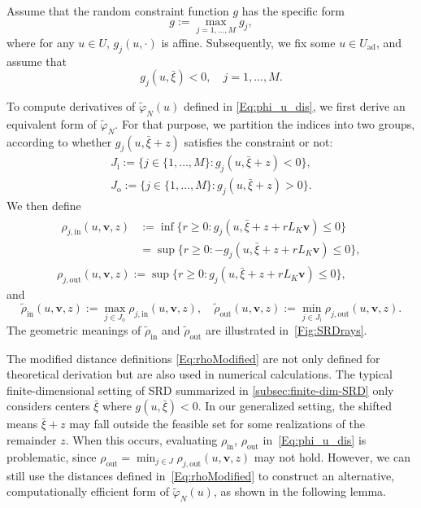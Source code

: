 \documentclass[%
onefignum,onetabnum]{siamonline250211}
\begin{document}
Assume that the random constraint function $g$ has the specific form
\begin{equation*}
    g:=\max_{j=1,\dots,M}g_j,
\end{equation*}
where for any $u\in U$, $g_j(u,\cdot)$ is affine. Subsequently, we fix some $u\in U_{\text{ad}}$, and assume that
\begin{equation}\label{Eq:neg_gj}
    g_j(u,\bar{\xi})<0,\quad j=1,\dots,M.
\end{equation}

To compute derivatives of $\tilde{\varphi}_N(u)$ defined in \eqref{Eq:phi_u_dis}, we first derive an equivalent form of $\tilde{\varphi}_N$. For that purpose, we partition the indices into two groups, according to whether $g_j(u,\bar{\xi}+z)$ satisfies the constraint or not:
\begin{gather*}
    J_{\mathrm{i}}:=\{j\in\{1,\dots,M\}:g_j(u,\bar{\xi}+z)< 0\}, \\
    J_{\mathrm{o}}:=\{j\in\{1,\dots,M\}:g_j(u,\bar{\xi}+z)> 0\}.
\end{gather*}
We then define
\begin{gather*}
    \begin{aligned}
        \rho_{j,\mathrm{in}}(u,\boldsymbol{v},z) &:= \inf{\{r\geq 0:g_j(u,\bar{\xi}+z+r L_K\boldsymbol{v})\leq 0\}} \\
        &= \sup{\{r\geq 0:-g_j(u,\bar{\xi}+z+r L_K\boldsymbol{v})\leq 0\}},
    \end{aligned} \\
    \rho_{j,\mathrm{out}}(u,\boldsymbol{v},z):=\sup{\{r\geq 0:g_j(u,\bar{\xi}+z+r L_K\boldsymbol{v})\leq 0\}},
\end{gather*}
and
\begin{equation}\label{Eq:rhoModified}
    \tilde{\rho}_{\mathrm{in}}(u,\boldsymbol{v},z):=\max_{j\in J_{\mathrm{o}}}{\rho_{j,\mathrm{in}}(u,\boldsymbol{v},z)},\quad \tilde{\rho}_{\mathrm{out}}(u,\boldsymbol{v},z):=\min_{j\in J_{\mathrm{i}}}{\rho_{j,\mathrm{out}}(u,\boldsymbol{v},z)}.
\end{equation}
The geometric meanings of $\tilde{\rho}_{\mathrm{in}}$ and $\tilde{\rho}_{\mathrm{out}}$ are illustrated in~\cref{Fig:SRDrays}.

The modified distance definitions \eqref{Eq:rhoModified} are not only defined for theoretical derivation but are also used in numerical calculations. The typical finite-dimensional setting of SRD summarized in \cref{subsec:finite-dim-SRD} only considers centers $\bar{\xi}$ where $g(u,\bar{\xi})<0$. In our generalized setting, the shifted means $\bar{\xi}+z$ may fall outside the feasible set for some realizations of the remainder $z$. When this occurs, evaluating $\rho_{\mathrm{in}}$, $\rho_{\mathrm{out}}$ in~\eqref{Eq:phi_u_dis} is problematic, since $\rho_{\mathrm{out}}=\min_{j\in J}{\rho_{j,\mathrm{out}}(u,\boldsymbol{v},z)}$ may not hold. However, we can still use the distances defined in~\eqref{Eq:rhoModified} to construct an alternative, computationally efficient form of $\tilde{\varphi}_N(u)$, as shown in the following lemma.
\end{document}
